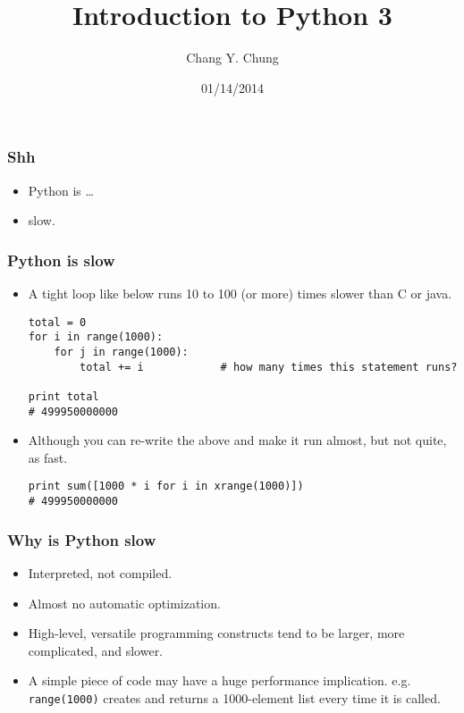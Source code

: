 \documentclass{beamer}
\begin{document}
\title{Introduction to Python 3}
\date{01/14/2014}
\author{Chang Y. Chung}

{
\begin{frame}[noframenumbering]
\titlepage
\end{frame}}

\begin{frame}[fragile]
\frametitle{Shh}
\begin{itemize}
\item<1-> Python is \ldots
\item<2-> slow.
\end{itemize}
\end{frame}

\begin{frame}[fragile]
\frametitle{Python is slow}
\begin{itemize}
\item<1-> A tight loop like below runs 10 to 100 (or more)
          times slower than C or java.
\begin{lstlisting}
total = 0
for i in range(1000):
    for j in range(1000):
        total += i            # how many times this statement runs?

print total
# 499950000000
\end{lstlisting}
\item<2-> Although you can re-write the above and make
          it run almost, but not quite, as fast.
\begin{lstlisting}
print sum([1000 * i for i in xrange(1000)])
# 499950000000
\end{lstlisting}
\end{itemize}
\end{frame}

\begin{frame}[fragile]
\frametitle{Why is Python slow}
\begin{itemize}
\item Interpreted, not compiled.
\item Almost no automatic optimization.
\item High-level, versatile programming constructs tend 
      to be larger, more complicated, and slower.
\item A simple piece of code may have a huge performance
      implication. e.g. \lstinline{range(1000)}
      creates and returns
      a 1000-element list every time it is called.
\end{itemize}
\end{frame}
\end{document}
